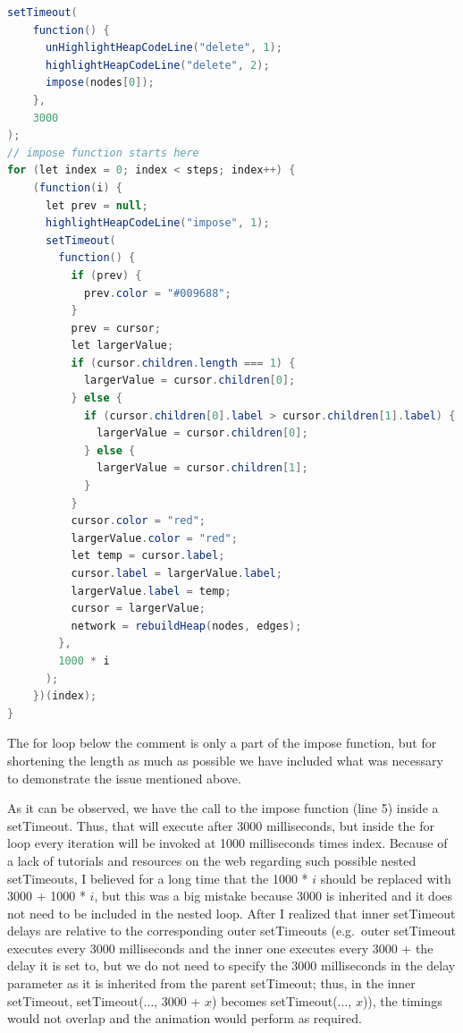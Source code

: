 \documentclass{l4proj}
\begin{document}
\begin{lstlisting}[language={Java}, label={nested-settimeouts}, caption={Heap animation that uses nested setTimeouts.}]
setTimeout(
    function() {
      unHighlightHeapCodeLine("delete", 1);
      highlightHeapCodeLine("delete", 2);
      impose(nodes[0]);
    },
    3000
);
// impose function starts here
for (let index = 0; index < steps; index++) {
    (function(i) {
      let prev = null;
      highlightHeapCodeLine("impose", 1);
      setTimeout(
        function() {
          if (prev) {
            prev.color = "#009688";
          }
          prev = cursor;
          let largerValue;
          if (cursor.children.length === 1) {
            largerValue = cursor.children[0];
          } else {
            if (cursor.children[0].label > cursor.children[1].label) {
              largerValue = cursor.children[0];
            } else {
              largerValue = cursor.children[1];
            }
          }
          cursor.color = "red";
          largerValue.color = "red";
          let temp = cursor.label;
          cursor.label = largerValue.label;
          largerValue.label = temp;
          cursor = largerValue;
          network = rebuildHeap(nodes, edges);
        },
        1000 * i
      );
    })(index);
}
\end{lstlisting}

The for loop below the comment is only a part of the impose function, but for shortening the length as much as possible
we have included what was necessary to demonstrate the issue mentioned above. 

As it can be observed, we have the call to the impose function (line 5) inside a setTimeout. Thus, that will execute
after 3000 milliseconds, but inside the for loop every iteration will be invoked at 1000 milliseconds times index.
Because of a lack of tutorials and resources on the web regarding such possible nested setTimeouts, I believed for a
long time that the 1000 * $i$ should be replaced with 3000 + 1000 * $i$, but this was a big mistake because 3000 is
inherited and it does not need to be included in the nested loop. After I realized that inner setTimeout delays are
relative to the corresponding outer setTimeouts (e.g.\ outer setTimeout executes every 3000 milliseconds and the inner
one executes every 3000 + the delay it is set to, but we do not need to specify the 3000 milliseconds in the delay
parameter as it is
inherited from the parent setTimeout; thus, in the inner setTimeout, setTimeout({$\dots$}, 3000 + $x$) becomes
setTimeout({$\dots$}, $x$)), the timings would not overlap
and the animation would perform as required.
\end{document}

